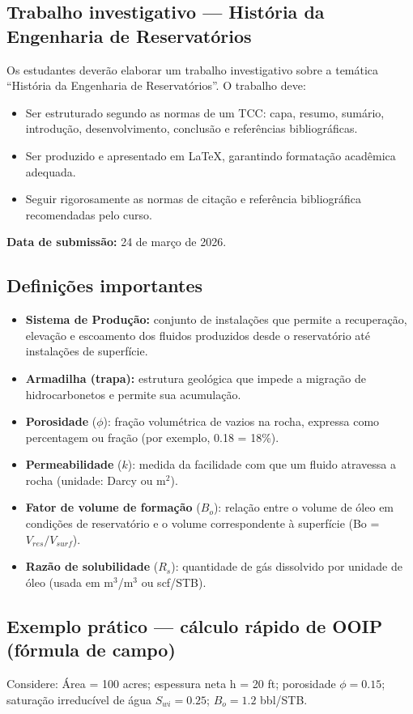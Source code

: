 \documentclass[11pt,a4paper]{article}
\begin{document}
\subsection{Trabalho investigativo — História da Engenharia de Reservatórios}
 Os estudantes deverão elaborar um trabalho investigativo sobre a temática “História da Engenharia de Reservatórios”. O trabalho deve:
\begin{itemize}
\item Ser estruturado segundo as normas de um TCC: capa, resumo, sumário, introdução, desenvolvimento, conclusão e referências bibliográficas.
\item Ser produzido e apresentado em LaTeX, garantindo formatação acadêmica adequada.
\item Seguir rigorosamente as normas de citação e referência bibliográfica recomendadas pelo curso.
\end{itemize}

 \textbf{Data de submissão:} 24 de março de 2026.

\subsection{Definições importantes}
\begin{itemize}
\item \textbf{Sistema de Produção:} conjunto de instalações que permite a recuperação, elevação e escoamento dos fluidos produzidos desde o reservatório até instalações de superfície.
\item \textbf{Armadilha (trapa):} estrutura geológica que impede a migração de hidrocarbonetos e permite sua acumulação.
\item \textbf{Porosidade} ($\phi$): fração volumétrica de vazios na rocha, expressa como percentagem ou fração (por exemplo, 0.18 = 18\%).
\item \textbf{Permeabilidade} ($k$): medida da facilidade com que um fluido atravessa a rocha (unidade: Darcy ou m$^2$).
\item \textbf{Fator de volume de formação} ($B_o$): relação entre o volume de óleo em condições de reservatório e o volume correspondente à superfície (Bo = $V_{res}/V_{surf}$).
\item \textbf{Razão de solubilidade} ($R_s$): quantidade de gás dissolvido por unidade de óleo (usada em m$^3$/m$^3$ ou scf/STB).
\end{itemize}

\subsection{Exemplo prático — cálculo rápido de OOIP (fórmula de campo)}
Considere: Área = 100 acres; espessura neta h = 20 ft; porosidade \(\phi = 0.15\); saturação irreducível de água \(S_{wi}=0.25\); \(B_o = 1.2\) bbl/STB.
\end{document}
